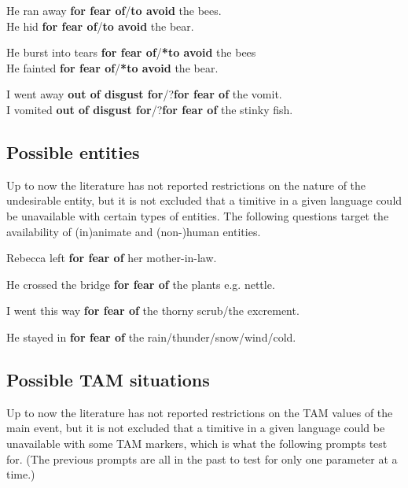 \documentclass[output=paper,colorlinks,citecolor=brown]{langscibook}
\begin{document}
\ea \label{p64}
\ea \label{p64a} He ran away \textbf{for fear of}/\textbf{to avoid} the bees. \\
\ex \label{p64b} He hid \textbf{for fear of}/\textbf{to avoid} the bear.
\z
\z

\ea \label{p65}
\ea \label{p65a} He burst into tears \textbf{for fear of}/\textbf{*to avoid} the bees \\
\ex \label{p65b} He fainted \textbf{for fear of}/\textbf{*to avoid} the bear.
\z
\z

\ea \label{p66}
\ea \label{p66a} I went away \textbf{out of disgust for}/?\textbf{for fear of} the vomit. \\
\ex \label{p66b} I vomited \textbf{out of disgust for}/?\textbf{for fear of} the stinky fish.
\z
\z

\subsection{Possible entities}
\label{subsec:timentities}

Up to now the literature has not reported restrictions on the nature of the undesirable entity, but it is not excluded that a timitive in a given language could be unavailable with certain types of entities. The following questions target the availability of (in)animate and (non-)human entities.

\ea \label{p67} Rebecca left \textbf{for fear of} her mother-in-law.
\z

\ea \label{p68} He crossed the bridge \textbf{for fear of} the plants {\op}\textnormal{e.g.} nettle{\cp}.
\z

\ea \label{p69} I went this way \textbf{for fear of} the thorny scrub\textnormal{/}the excrement.
\z

\ea \label{p70} He stayed in \textbf{for fear of} the rain\textnormal{/}thunder\textnormal{/}snow\textnormal{/}wind\textnormal{/}cold.
\z

\subsection{Possible TAM situations}
\label{subsec:timTAM}

Up to now the literature has not reported restrictions on the TAM values of the main event, but it is not excluded that a timitive in a given language could be unavailable with some TAM markers, which is what the following prompts test for. (The previous prompts are all in the past to test for only one parameter at a time.)
\end{document}
